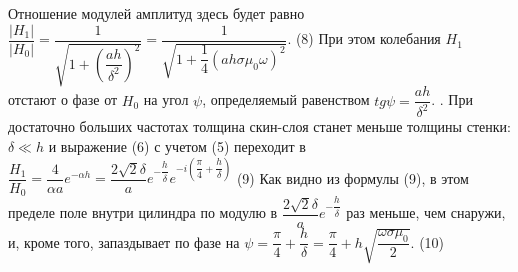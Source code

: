 \documentclass{article}
\begin{document}
\newline
\newline Отношение модулей амплитуд здесь будет равно
\newline
\centering $\dfrac{|H_1|}{|H_0|} = \dfrac{1}{\sqrt{1 + (\dfrac{ah}{\delta^2})^2}} = \dfrac{1}{\sqrt{1 + \dfrac{1}{4}(ah\sigma\mu_0\omega)^2}}$.   (8)
\newline
\newline При этом колебания $H_1$ отстают о фазе от $H_0$ на угол $\psi$, определяемый равенством $tg\psi = \dfrac{ah}{\delta^2}$.
. При достаточно больших частотах толщина скин-слоя станет меньше толщины стенки: $\delta \ll h$ и выражение (6) с учетом (5) переходит в 
\newline
\centering $\dfrac{H_1}{H_0} = \dfrac{4}{\alpha a} e^{-\alpha h} = \dfrac{2\sqrt{2} \delta}{a} e^{-\dfrac{h}{\delta}} e^{-i(\dfrac{\pi}{4} + \dfrac{h}{\delta})}$  (9)
\newline
\newline Как видно из формулы (9), в этом пределе поле внутри цилиндра по модулю в $\dfrac{2\sqrt{2} \delta}{a} e^{-\dfrac{h}{\delta}}$ раз меньше, чем снаружи, и, кроме того, запаздывает по фазе на 
\newline
\centering $\psi = \dfrac{\pi}{4} + \dfrac{h}{\delta} = \dfrac{\pi}{4} + h \sqrt{\dfrac{\omega \sigma \mu_0}{2}}$.      (10)
\end{document}

